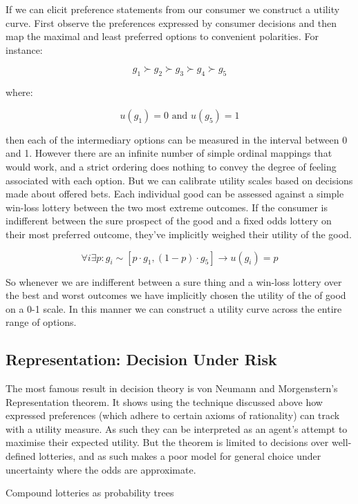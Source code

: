 \documentclass{tufte-handout}
\begin{document}
If we can elicit preference statements from our consumer we construct a utility curve. First observe the preferences expressed by consumer decisions and then map the maximal and least preferred options to convenient polarities. For instance:

$$ g_{1} \succ g_{2} \succ g_{3} \succ g_{4} \succ g_{5} $$

\noindent where:

$$ u(g_{1}) = 0 \text{ and } u(g_{5}) = 1 $$

\noindent then each of the intermediary options can be measured in the interval between 0 and 1. However there are an infinite number of simple ordinal mappings that would work, and a strict ordering does nothing to convey the degree of feeling associated with each option. But we can calibrate utility scales based on decisions made about offered bets. Each individual good can be assessed against a simple win-loss lottery between the two most extreme outcomes. If the consumer is indifferent between the sure prospect of the good and a fixed odds lottery on their most preferred outcome, they've implicitly weighed their utility of the good. 

$$ \forall i \exists  p :  g _{i} \sim [p \cdot g_{1}, (1-p)\cdot g_{5}] \rightarrow u(g_{i}) = p $$

\noindent So whenever we are indifferent between a sure thing and a win-loss lottery over the best and worst outcomes we have implicitly chosen the utility of the of good on a 0-1 scale. In this manner we can construct a utility curve across the entire range of options. 

\subsection{Representation: Decision Under Risk}
The most famous result in decision theory is von Neumann and Morgenstern's Representation theorem. It shows using the technique discussed above how expressed preferences (which adhere to certain axioms of rationality) can track with a utility measure.  As such they can be interpreted as an agent's attempt to maximise their expected utility.  But the theorem is limited to decisions over well-defined lotteries, and as such makes a poor model for general choice under uncertainty where the odds are approximate. 

\begin{marginfigure}
\caption{Compound lotteries as probability trees}%
  
  \label{fig:compound lotteries}%
\end{marginfigure}
\end{document}
